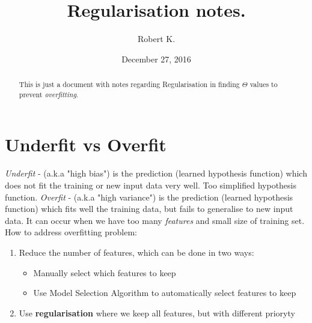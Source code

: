 \documentclass{article}
\author{Robert K.}
\title{Regularisation notes.}
\date{December 27, 2016}
\begin{document}
\maketitle
\begin{abstract}
This is just a document with notes regarding Regularisation in finding $\Theta$ values to prevent \textit{overfitting}.
\end{abstract}

\section{Underfit vs Overfit}
\textit{Underfit} - (a.k.a "high bias") is the prediction (learned hypothesis function) which does not fit the training or new input data very well. Too simplified hypothesis function. 
\newline
\textit{Overfit} - (a.k.a "high variance") is the prediction (learned hypothesis function) which fits well the training data, but fails to generalise to new input data. It can occur when we have too many \textit{features} and small size of training set. 
\newline
\newline
How to address overfitting problem:
\begin{enumerate}
	\item Reduce the number of features, which can be done in two ways:
		\begin{itemize}
			\item Manually select which features to keep
			\item Use Model Selection Algorithm to automatically select features to keep
		\end{itemize}
	\item Use \textbf{regularisation} where we keep all features, but with different prioryty
\end{enumerate}
\end{document}
